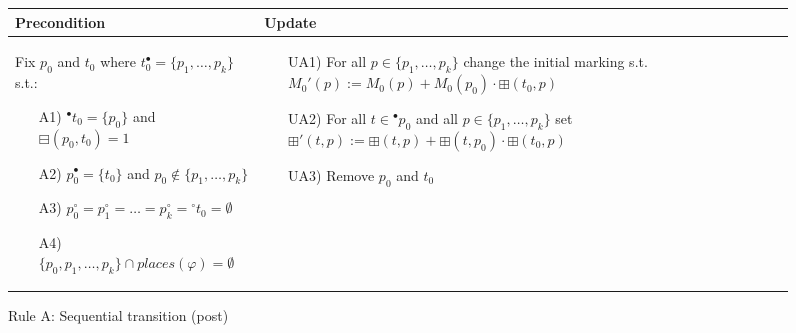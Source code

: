 \begin{figure}[h]
    \begin{adjustbox}{center}
        \begin{tabular}{|p{70mm}|p{62mm}|} \hline
        Precondition & Update \\ \hline
        Fix $p_0$ and $t_0$ where $t_0^\bullet=\{p_1,\dotsc,p_k\}$ s.t.:
        \begin{itemize}[leftmargin=10mm]
            \item[A1)] ${}^\bullet t_0=\{p_0\}$ and $\boxminus(p_0, t_0)=1$
            \item[A2)] $p_0^\bullet=\{t_0\}$ and $p_0\notin\{p_1,\dotsc,p_k\}$
            \item[A3)] $p_0^\circ=p_1^\circ=\dots=p_k^\circ={}^\circ t_0=\emptyset$
            \item[A4)] $\{p_0, p_1,\dotsc,p_k\}\cap places(\varphi)=\emptyset$
        \end{itemize} &
        \begin{itemize}[leftmargin=10mm]
            \item[UA1)] For all $p\in\{p_1,\dotsc,p_k\}$ change the initial marking s.t.\ $M_0'(p):=M_0(p)+M_0(p_0)\cdot\boxplus(t_0, p)$
            \item[UA2)] For all $t\in{}^\bullet p_0$ and all $p\in\{p_1,\dotsc,p_k\}$ set $\boxplus'(t,p):=\boxplus(t,p)+\boxplus(t,p_0)\cdot\boxplus(t_0,p)$
            \item[UA3)] Remove $p_0$ and $t_0$
        \end{itemize} \\ \hline
        \end{tabular}
    \end{adjustbox}
    \caption{Rule A: Sequential transition (post)}
    \label{fig:rule_a_post}
\end{figure}
